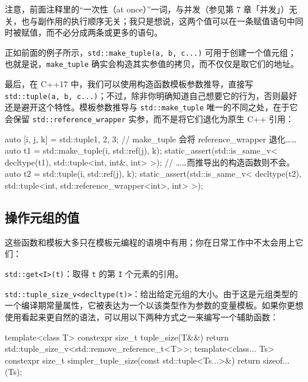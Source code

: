 注意，前面注释里的“一次性（at once）”一词，与并发（参见第 7 章「并发」）无关，也与副作用的执行顺序无关；我只是想说，这两个值可以在一条赋值语句中同时被赋值，而不必分成两条或更多的语句。

正如前面的例子所示，\texttt{std::\allowbreak{}make\_\allowbreak{}tuple(\allowbreak{}a,\allowbreak{} b,\allowbreak{} c...)\allowbreak{}} 可用于创建一个值元组；也就是说，\texttt{make\_\allowbreak{}tuple} 确实会构造其实参值的拷贝，而不仅仅是取它们的地址。

最后，在 C++17 中，我们可以使用构造函数模板参数推导，直接写 \texttt{std::\allowbreak{}tuple(\allowbreak{}a,\allowbreak{} b,\allowbreak{} c...)\allowbreak{}}；不过，除非你明确知道自己想要它的行为，否则最好还是避开这个特性。模板参数推导与 \texttt{std::\allowbreak{}make\_\allowbreak{}tuple} 唯一的不同之处，在于它会保留 \texttt{std::\allowbreak{}reference\_\allowbreak{}wrapper} 实参，而不是将它们退化为原生 C++ 引用：

\begin{codebox}[cpp]
    auto [i, j, k] = std::tuple{1, 2, 3};
    // make_tuple 会将 reference_wrapper 退化……
    auto t1 = std::make_tuple(i, std::ref(j), k);
    static_assert(std::is_same_v< decltype(t1),
      std::tuple<int, int&, int>
    >);
    // ……而推导出的构造函数则不会。
    auto t2 = std::tuple(i, std::ref(j), k);
    static_assert(std::is_same_v< decltype(t2),
      std::tuple<int, std::reference_wrapper<int>, int>
    >);
\end{codebox}

\subsection{操作元组的值}

这些函数和模板大多只在模板元编程的语境中有用；你在日常工作中不太会用上它们：

\texttt{std::\allowbreak{}get<\allowbreak{}I>\allowbreak{}(\allowbreak{}t)\allowbreak{}}：取得 \texttt{t} 的第 \texttt{I} 个元素的引用。

\texttt{std::\allowbreak{}tuple\_\allowbreak{}size\_\allowbreak{}v<\allowbreak{}decltype(\allowbreak{}t)\allowbreak{}>}：给出给定元组的大小。由于这是元组类型的一个编译期常量属性，它被表达为一个以该类型作为参数的变量模板。如果你更想使用看起来更自然的语法，可以用以下两种方式之一来编写一个辅助函数：

\begin{codebox}[cpp]
        template<class T>
        constexpr size_t tuple_size(T&&)
        {
          return std::tuple_size_v<std::remove_reference_t<T>>;
        }
        template<class... Ts>
        constexpr size_t simpler_tuple_size(const std::tuple<Ts...>&)
        {
          return sizeof...(Ts);
        }
\end{codebox}

